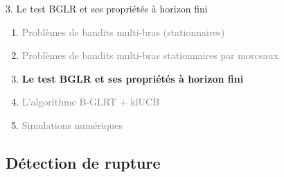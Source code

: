 \documentclass[11pt,french,ignorenonframetext,]{beamer}
\begin{document}
\begin{frame}{3. Le test BGLR et ses propriétés à horizon fini}

  \begin{enumerate}
    \item
    \textcolor{gray}{
      Problèmes de bandits multi-bras (stationnaires)
    }
    \vspace*{15pt}

    \item
    \textcolor{gray}{
      Problèmes de bandits multi-bras stationnaires par morceaux
    }
    \vspace*{15pt}

    \item
    \alert{\textbf{%
      Le test BGLR et ses propriétés à horizon fini
    }}
    \vspace*{15pt}

    \item
    \textcolor{gray}{
      L'algorithme B-GLRT + klUCB
    }
    \vspace*{15pt}


    \item
    \textcolor{gray}{
      Simulations numériques
    }
  \end{enumerate}

\end{frame}


\subsection{\hfill{}Détection de rupture\hfill{}}
\end{document}
